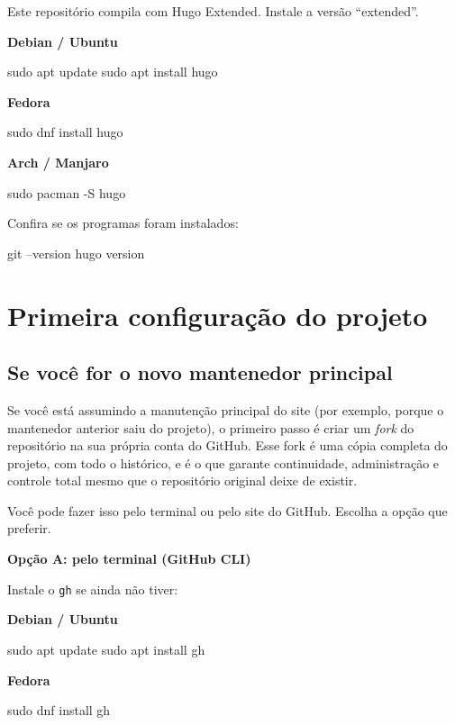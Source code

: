 \documentclass[11pt,a4paper]{article}
\begin{document}
Este repositório compila com Hugo Extended. Instale a versão ``extended''.

\textbf{Debian / Ubuntu}
\begin{terminal}
sudo apt update
sudo apt install hugo
\end{terminal}

\textbf{Fedora}
\begin{terminal}
sudo dnf install hugo
\end{terminal}

\textbf{Arch / Manjaro}
\begin{terminal}
sudo pacman -S hugo
\end{terminal}

Confira se os programas foram instalados:

\begin{terminal}
git --version
hugo version
\end{terminal}

\section{Primeira configuração do projeto}

\subsection{Se você for o novo mantenedor principal}

Se você está assumindo a manutenção principal do site (por exemplo, porque o mantenedor anterior saiu do
projeto), o primeiro passo é criar um \emph{fork} do repositório na sua própria conta do GitHub.
Esse fork é uma cópia completa do projeto, com todo o histórico, e é o que garante continuidade,
administração e controle total mesmo que o repositório original deixe de existir.

Você pode fazer isso pelo terminal ou pelo site do GitHub. Escolha a opção que preferir.

\textbf{Opção A: pelo terminal (GitHub CLI)}

Instale o \texttt{gh} se ainda não tiver:

\textbf{Debian / Ubuntu}
\begin{terminal}
sudo apt update
sudo apt install gh
\end{terminal}

\textbf{Fedora}
\begin{terminal}
sudo dnf install gh
\end{terminal}
\end{document}
